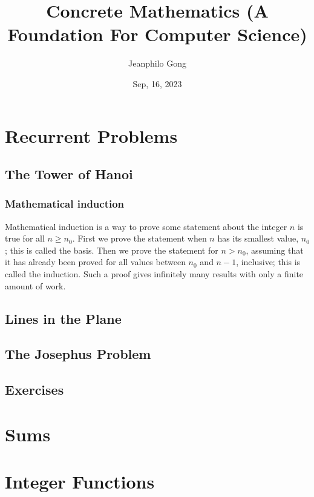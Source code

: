 \documentclass{book}
\title{Concrete Mathematics (A Foundation For Computer Science)}
\author{Jeanphilo Gong}
\date{Sep, 16, 2023}
\begin{document}
\maketitle  %

\tableofcontents  %

\chapter{Recurrent Problems}

\section{The Tower of Hanoi}

\subsection*{Mathematical induction}

Mathematical induction is a way to prove some statement about the integer \( n \) is true for all \( n \geq n_0 \). First we prove the statement when \( n \) has its smallest value, \( n_0 \); this is called the basis. Then we prove the statement for \( n > n_0 \), assuming that it has already been proved for all values between \( n_0 \) and \( n - 1 \), inclusive; this is called the induction. Such a proof gives infinitely many results with only a finite amount of work.

\section{Lines in the Plane}

\section{The Josephus Problem}

\section*{Exercises}

\chapter{Sums}

\chapter{Integer Functions}
\end{document}
